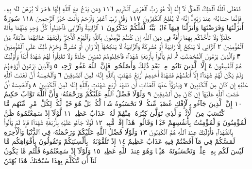 فَتَعَٰلَى ٱللَّهُ ٱلْمَلِكُ ٱلْحَقُّۖ لَآ إِلَٰهَ إِلَّا هُوَ رَبُّ ٱلْعَرْشِ ٱلْكَرِيمِ ١١٦
وَمَن يَدْعُ مَعَ ٱللَّهِ إِلَٰهًا ءَاخَرَ لَا بُرْهَٰنَ لَهُۥ بِهِۦ
فَإِنَّمَا حِسَابُهُۥ عِندَ رَبِّهِۦٓۚ إِنَّهُۥ لَا يُفْلِحُ ٱلْكَٰفِرُونَ ١١٧
وَقُل رَّبِّ ٱغْفِرْ وَٱرْحَمْ وَأَنتَ خَيْرُ ٱلرَّٰحِمِينَ ١١٨
سُورَةٌ أَنزَلْنَٰهَا وَفَرَضْنَٰهَا وَأَنزَلْنَا فِيهَآ ءَايَٰتِۭ بَيِّنَٰتࣲ لَّعَلَّكُمْ تَذَكَّرُونَ ١
ٱلزَّانِيَةُ وَٱلزَّانِي فَٱجْلِدُوا۟ كُلَّ وَٰحِدࣲ مِّنْهُمَا مِا۟ئَةَ جَلْدَةࣲۖ وَلَا تَأْخُذْكُم بِهِمَا
رَأْفَةࣱ فِي دِينِ ٱللَّهِ إِن كُنتُمْ تُؤْمِنُونَ بِٱللَّهِ وَٱلْيَوْمِ ٱلْأٓخِرِۖ وَلْيَشْهَدْ عَذَابَهُمَا
طَآئِفَةࣱ مِّنَ ٱلْمُؤْمِنِينَ ٢ ٱلزَّانِي لَا يَنكِحُ إِلَّا زَانِيَةً أَوْ مُشْرِكَةࣰ وَٱلزَّانِيَةُ
لَا يَنكِحُهَآ إِلَّا زَانٍ أَوْ مُشْرِكࣱۚ وَحُرِّمَ ذَٰلِكَ عَلَى ٱلْمُؤْمِنِينَ ٣ وَٱلَّذِينَ
يَرْمُونَ ٱلْمُحْصَنَٰتِ ثُمَّ لَمْ يَأْتُوا۟ بِأَرْبَعَةِ شُهَدَآءَ فَٱجْلِدُوهُمْ ثَمَٰنِينَ
جَلْدَةࣰ وَلَا تَقْبَلُوا۟ لَهُمْ شَهَٰدَةً أَبَدࣰاۚ وَأُو۟لَٰٓئِكَ هُمُ ٱلْفَٰسِقُونَ ٤ إِلَّا
ٱلَّذِينَ تَابُوا۟ مِنۢ بَعْدِ ذَٰلِكَ وَأَصْلَحُوا۟ فَإِنَّ ٱللَّهَ غَفُورࣱ رَّحِيمࣱ ٥ وَٱلَّذِينَ
يَرْمُونَ أَزْوَٰجَهُمْ وَلَمْ يَكُن لَّهُمْ شُهَدَآءُ إِلَّآ أَنفُسُهُمْ فَشَهَٰدَةُ أَحَدِهِمْ أَرْبَعُ
شَهَٰدَٰتِۭ بِٱللَّهِ إِنَّهُۥ لَمِنَ ٱلصَّٰدِقِينَ ٦ وَٱلْخَٰمِسَةُ أَنَّ لَعْنَتَ ٱللَّهِ عَلَيْهِ
إِن كَانَ مِنَ ٱلْكَٰذِبِينَ ٧ وَيَدْرَؤُا۟ عَنْهَا ٱلْعَذَابَ أَن تَشْهَدَ أَرْبَعَ شَهَٰدَٰتِۭ
بِٱللَّهِ إِنَّهُۥ لَمِنَ ٱلْكَٰذِبِينَ ٨ وَٱلْخَٰمِسَةَ أَنَّ غَضَبَ ٱللَّهِ عَلَيْهَآ إِن كَانَ مِنَ
ٱلصَّٰدِقِينَ ٩ وَلَوْلَا فَضْلُ ٱللَّهِ عَلَيْكُمْ وَرَحْمَتُهُۥ وَأَنَّ ٱللَّهَ تَوَّابٌ حَكِيمٌ ١٠
إِنَّ ٱلَّذِينَ جَآءُو بِٱلْإِفْكِ عُصْبَةࣱ مِّنكُمْۚ لَا تَحْسَبُوهُ شَرࣰّا لَّكُمۖ بَلْ
هُوَ خَيْرࣱ لَّكُمْۚ لِكُلِّ ٱمْرِئࣲ مِّنْهُم مَّا ٱكْتَسَبَ مِنَ ٱلْإِثْمِۚ وَٱلَّذِي تَوَلَّىٰ
كِبْرَهُۥ مِنْهُمْ لَهُۥ عَذَابٌ عَظِيمࣱ ١١ لَّوْلَآ إِذْ سَمِعْتُمُوهُ ظَنَّ ٱلْمُؤْمِنُونَ
وَٱلْمُؤْمِنَٰتُ بِأَنفُسِهِمْ خَيْرࣰا وَقَالُوا۟ هَٰذَآ إِفْكࣱ مُّبِينࣱ ١٢ لَّوْلَا
جَآءُو عَلَيْهِ بِأَرْبَعَةِ شُهَدَآءَۚ فَإِذْ لَمْ يَأْتُوا۟ بِٱلشُّهَدَآءِ فَأُو۟لَٰٓئِكَ
عِندَ ٱللَّهِ هُمُ ٱلْكَٰذِبُونَ ١٣ وَلَوْلَا فَضْلُ ٱللَّهِ عَلَيْكُمْ وَرَحْمَتُهُۥ
فِي ٱلدُّنْيَا وَٱلْأٓخِرَةِ لَمَسَّكُمْ فِي مَآ أَفَضْتُمْ فِيهِ عَذَابٌ عَظِيمٌ ١٤
إِذْ تَلَقَّوْنَهُۥ بِأَلْسِنَتِكُمْ وَتَقُولُونَ بِأَفْوَاهِكُم مَّا لَيْسَ لَكُم بِهِۦ عِلْمࣱ
وَتَحْسَبُونَهُۥ هَيِّنࣰا وَهُوَ عِندَ ٱللَّهِ عَظِيمࣱ ١٥ وَلَوْلَآ إِذْ سَمِعْتُمُوهُ
قُلْتُم مَّا يَكُونُ لَنَآ أَن نَّتَكَلَّمَ بِهَٰذَا سُبْحَٰنَكَ هَٰذَا بُهْتَٰنٌ

